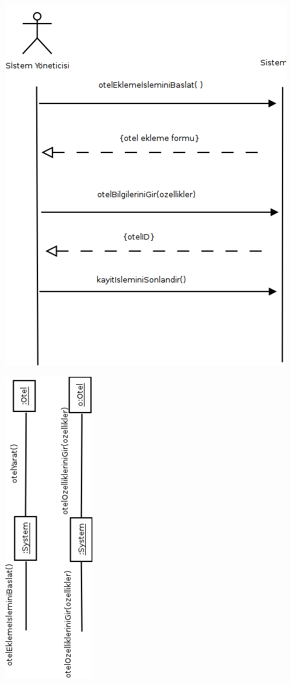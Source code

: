 \documentclass[12pt,a4paper]{report}
\begin{document}
\newpage

\begin{center}
\includegraphics{dia/ssd-usecase4.png}
\end{center}

\newpage

\begin{center}
\includegraphics{dia/eventdiagram-usecase4.png}
\end{center}
\end{document}
